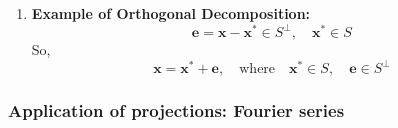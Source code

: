 \begin{example}
\begin{enumerate}
            \item \textbf{Example of Orthogonal Decomposition:}
            \[
            \mathbf{e} = \mathbf{x} - \mathbf{x}^* \in S^\perp, \quad \mathbf{x}^* \in S
            \]
            So, 
            \[
            \mathbf{x} = \mathbf{x}^* + \mathbf{e}, \quad \text{where} \quad \mathbf{x}^* \in S, \quad \mathbf{e} \in S^\perp
            \]
        \end{enumerate}

        \end{example}

    \subsubsection{Application of projections: Fourier series}
